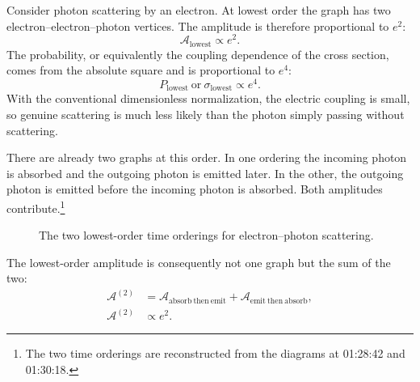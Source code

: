 Consider photon scattering by an electron. At lowest order the graph has two electron--electron--photon vertices. The amplitude is therefore proportional to \(e^2\):
\begin{equation}
\mathcal{A}_{\mathrm{lowest}}\propto e^2.
\end{equation}
The probability, or equivalently the coupling dependence of the cross section, comes from the absolute square and is proportional to \(e^4\):
\begin{equation}
P_{\mathrm{lowest}}\ \text{or}\ \sigma_{\mathrm{lowest}}
\propto e^4.
\end{equation}
With the conventional dimensionless normalization, the electric coupling is small, so genuine scattering is much less likely than the photon simply passing without scattering.

There are already two graphs at this order. In one ordering the incoming photon is absorbed and the outgoing photon is emitted later. In the other, the outgoing photon is emitted before the incoming photon is absorbed. Both amplitudes contribute.\footnote{The two time orderings are reconstructed from the diagrams at 01:28:42 and 01:30:18.}

\begin{figure}[htbp]
\centering
{}
\caption{The two lowest-order time orderings for electron--photon scattering.}
\end{figure}

The lowest-order amplitude is consequently not one graph but the sum of the two:
\begin{equation}
\begin{aligned}
\mathcal{A}^{(2)}
&=
\mathcal{A}_{\mathrm{absorb\ then\ emit}}
+\mathcal{A}_{\mathrm{emit\ then\ absorb}},\\
\mathcal{A}^{(2)}&\propto e^2.
\end{aligned}
\end{equation}

